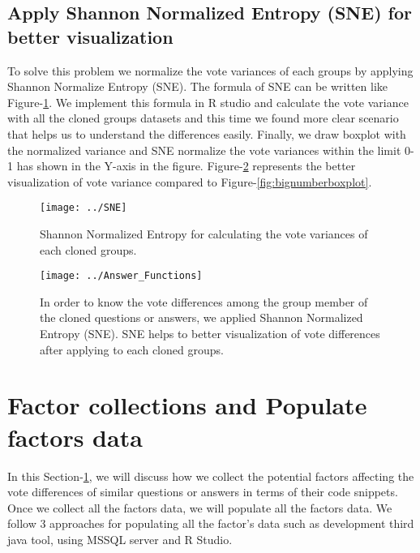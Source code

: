 \documentclass[conference]{IEEEtran}
\begin{document}
	\subsection{Apply Shannon Normalized Entropy (SNE) for better visualization}
	To solve this problem we normalize the vote variances of each groups by applying  Shannon Normalize Entropy (SNE). The formula of SNE can be written like Figure-\ref{fig:sne}. We implement this formula in R studio and calculate the vote variance with all the cloned groups datasets and this time we found more clear scenario that helps us to understand the differences easily. Finally, we draw boxplot with the normalized variance and SNE normalize the vote variances within the limit 0-1 has shown in the Y-axis in the figure. Figure-\ref{fig:answerfunctions} represents the better visualization of vote variance compared to Figure-\ref{fig:bignumberboxplot}. 
	\begin{figure}
		\centering
		\texttt{[image: ../SNE]}
		\caption{Shannon Normalized Entropy for calculating the vote variances of each cloned groups.}
		\label{fig:sne}
	\end{figure}
	\begin{figure}
		\centering
		\texttt{[image: ../Answer\_Functions]}
		\caption{ In order to know the vote differences among the group member of the cloned questions or answers, we applied Shannon Normalized Entropy (SNE). SNE helps to better visualization of vote differences after applying to each cloned groups.}
		\label{fig:answerfunctions}
	\end{figure}
	
	
	
	\section{Factor collections and Populate factors data} \label{FCMM}
	In this Section-\ref{FCMM}, we will discuss how we collect the potential factors affecting the vote differences of similar questions or answers in terms of their code snippets. Once we collect all the factors data, we will populate all the factors data. We follow 3  approaches for populating all the factor's data such as development third java tool, using MSSQL server and R Studio. 
	
\end{document}
